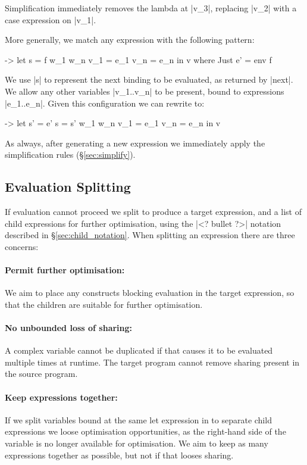 \documentclass[draft]{sigplanconf}
\begin{document}
Simplification immediately removes the lambda at |v_3|, replacing |v_2| with a case expression on |v_1|.

More generally, we match any expression with the following pattern:

\begin{code}
\free ->  let  s    = f w_1 w_n
               v_1  = e_1
               v_n  = e_n
          in   v
where Just e' = env f
\end{code}

We use |s| to represent the next binding to be evaluated, as returned by |next|. We allow any other variables |v_1..v_n| to be present, bound to expressions |e_1..e_n|. Given this configuration we can rewrite to:

\begin{code}
\free ->  let  s'   = e'
               s    = s' w_1 w_n
               v_1  = e_1
               v_n  = e_n
          in   v
\end{code}

As always, after generating a new expression we immediately apply the simplification rules (\S\ref{sec:simplify}).

\subsection{Evaluation Splitting}
\label{sec:eval_split}

If evaluation cannot proceed we split to produce a target expression, and a list of child expressions for further optimisation, using the |<? bullet ?>| notation described in \S\ref{sec:child_notation}. When splitting an expression there are three concerns:

\paragraph{Permit further optimisation:} We aim to place any constructs blocking evaluation in the target expression, so that the children are suitable for further optimisation.

\paragraph{No unbounded loss of sharing:} A complex variable cannot be duplicated if that causes it to be evaluated multiple times at runtime. The target program cannot remove sharing present in the source program.

\paragraph{Keep expressions together:} If we split variables bound at the same let expression in to separate child expressions we loose optimisation opportunities, as the right-hand side of the variable is no longer available for optimisation. We aim to keep as many expressions together as possible, but not if that looses sharing.
\end{document}

